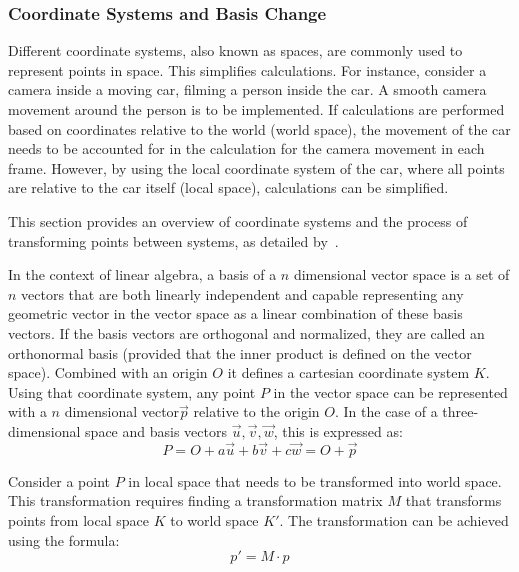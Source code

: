 \subsubsection{Coordinate Systems and Basis Change}

Different coordinate systems, also known as spaces, are commonly used to represent points in space.
This simplifies calculations.
For instance, consider a camera inside a moving car, filming a person inside the car.
A smooth camera movement around the person is to be implemented.
If calculations are performed based on coordinates relative to the world (world space),
the movement of the car needs to be accounted for in the calculation for the camera movement in each frame.
However, by using the local coordinate system of the car, where all points are relative to the car itself (local space),
calculations can be simplified.

This section provides an overview of coordinate systems and the process of transforming points between systems, as detailed by~\cite{dorner_virtual_2019}.

In the context of linear algebra,
a basis of a $n$ dimensional vector space is a set of $n$ vectors that are both linearly independent
and capable representing any geometric vector in the vector space as a linear combination of these basis vectors.
If the basis vectors are orthogonal and normalized,
they are called an orthonormal basis (provided that the inner product is defined on the vector space).
Combined with an origin $O$ it defines a cartesian coordinate system $K$.
Using that coordinate system, any point $P$ in the vector space can be represented with a $n$ dimensional
vector$\vec{p}$ relative to the origin $O$.
In the case of a three-dimensional space and basis vectors $\vec{u}, \vec{v}, \vec{w}$, this is expressed as:
\begin{equation}
    P = O + a\vec{u} + b\vec{v} + c\vec{w} = O + \vec{p}
\end{equation}

Consider a point $P$ in local space that needs to be transformed into world space.
This transformation requires finding a transformation matrix $M$ that transforms points
from local space $K$ to world space $K'$.
The transformation can be achieved using the formula:
\begin{equation}
    p' = M\cdot p
\end{equation}

